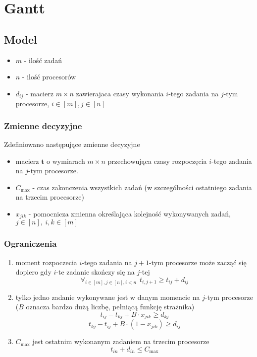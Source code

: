 \section{Gantt}

\subsection{Model}
\begin{itemize}
    \item $m$ - ilość zadań
    \item $n$ - ilość procesorów
    \item $d_{ij}$ - macierz $m\times n$ zawierajaca czasy wykonania $i$-tego zadania na $j$-tym procesorze, $i\in[m], j\in[n]$
\end{itemize}

\subsubsection{Zmienne decyzyjne}
Zdefiniowano następujące zmienne decyzyjne
\begin{itemize}
    \item macierz $\mathbf{t}$ o wymiarach $m \times n$ przechowująca czasy rozpoczęcia $i$-tego zadania na $j$-tym procesorze.
    \item $C_{\text{max}}$ - czas zakonczenia wszystkich zadań (w szczególności ostatniego zadania na trzecim procesorze)
    \item $x_{jik}$ - pomocnicza zmienna określająca kolejność wykonywanych zadań, $j\in[n],\hspace{3pt}i,k\in[m]$
\end{itemize}

\subsubsection{Ograniczenia}
\begin{enumerate}
    \item moment rozpoczecia $i$-tego zadania na $j+1$-tym procesorze może zacząć się dopiero gdy $i$-te zadanie skończy się na $j$-tej
    $$ \forall_{i\in[m], j\in[n], i < n} \hspace{5pt} t_{i, j+1} \geq t_{ij} + d_{ij} $$
    \item tylko jedno zadanie wykonywane jest w danym momencie na $j$-tym procesorze ($B$ oznacza bardzo dużą liczbę, pełniącą funkcję strażnika)
    $$ t_{ij} - t_{kj} + B \cdot x_{jik} \geq d_{kj} $$
    $$ t_{kj} - t_{ij} + B \cdot (1 - x_{jik}) \geq d_{ij} $$
    \item $C_{\text{max}}$ jest ostatnim wykonanym zadaniem na trzecim procesorze
    $$ t_{in} + d_{in} \leq C_{\text{max}} $$
\end{enumerate}

